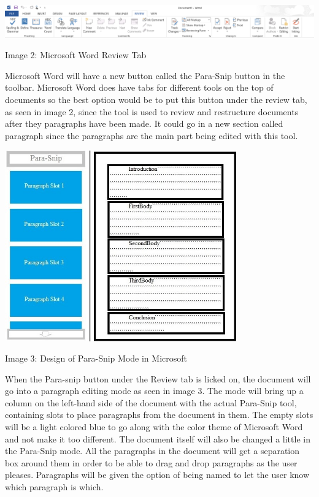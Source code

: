 \documentclass{article}
\begin{document}
\begin{center}
\includegraphics[width=150mm]{MWReview.png}
\end{center}
\begin{center}
Image 2: Microsoft Word Review Tab
\end{center}
\medskip

	Microsoft Word will have a new button called the Para-Snip button in the toolbar. Microsoft Word does have tabs for different tools on the top of documents so the best option would be to put this button under the review tab, as seen in image 2, since the tool is used to review and restructure documents after they paragraphs have been made. It could go in a new section called paragraph since the paragraphs are the main part being edited with this tool.
\bigskip

\begin{center}
\includegraphics[width=100mm]{Essay2.jpg}
\end{center}
\begin{center}
Image 3: Design of Para-Snip Mode in Microsoft
\end{center}
\medskip

	When the Para-snip button under the Review tab is licked on, the document will go into a paragraph editing mode as seen in image 3. The mode will bring up a column on the left-hand side of the document with the actual Para-Snip tool, containing slots to place paragraphs from the document in them. The empty slots will be a light colored blue to go along with the color theme of Microsoft Word and not make it too different. The document itself will also be changed a little in the Para-Snip mode. All the paragraphs in the document will get a separation box around them in order to be able to drag and drop paragraphs as the user pleases. Paragraphs will be given the option of being named to let the user know which paragraph is which.
	
\end{document}
